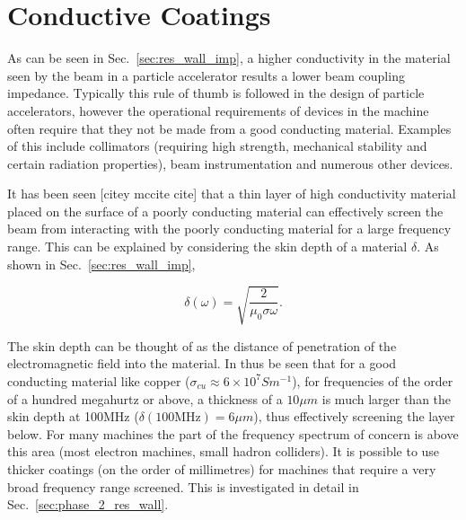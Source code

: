 \section{Conductive Coatings}
\label{sec:conductive_coatings}

As can be seen in Sec.~\ref{sec:res_wall_imp}, a higher conductivity in the material seen by the beam in a particle accelerator results a lower beam coupling impedance. Typically this rule of thumb is followed in the design of particle accelerators, however the operational requirements of devices in the machine often require that they not be made from a good conducting material. Examples of this include collimators (requiring high strength, mechanical stability and certain radiation properties),  beam instrumentation and numerous other devices.

It has been seen [citey mccite cite] that a thin layer of high conductivity material placed on the surface of a poorly conducting material can effectively screen the beam from interacting with the poorly conducting material for a large frequency range. This can be explained by considering the skin depth of a material $\delta$. As shown in Sec.~\ref{sec:res_wall_imp}, 

\begin{equation}
\delta \left( \omega \right) = \sqrt{\frac{2}{\mu_{0} \sigma \omega}}.
\end{equation}

The skin depth can be thought of as the distance of penetration of the electromagnetic field into the material. In thus be seen that for a good conducting material like copper ($\sigma_{cu} \approx 6 \times 10^{7} S m^{-1}$), for frequencies of the order of a hundred megahurtz or above, a thickness of a $10\mu m$ is much larger than the skin depth at 100MHz ($\delta \left( 100\text{MHz} \right) = 6\mu m$), thus effectively screening the layer below. For many machines the part of the frequency spectrum of concern is above this area (most electron machines, small hadron colliders). It is possible to use thicker coatings (on the order of millimetres) for machines that require a very broad frequency range screened. This is investigated in detail in Sec.~\ref{sec:phase_2_res_wall}.

